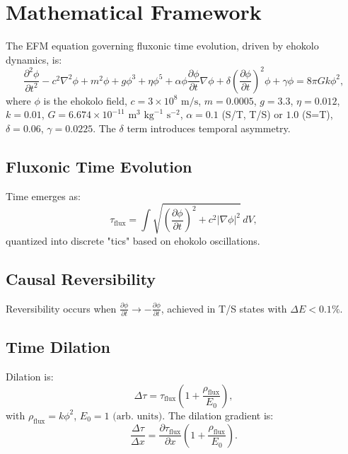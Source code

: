 \documentclass[11pt]{article}
\begin{document}
\section{Mathematical Framework}
The EFM equation governing fluxonic time evolution, driven by ehokolo dynamics, is:
\begin{equation}
\frac{\partial^2 \phi}{\partial t^2} - c^2 \nabla^2 \phi + m^2 \phi + g \phi^3 + \eta \phi^5 + \alpha \phi \frac{\partial \phi}{\partial t} \nabla \phi + \delta \left(\frac{\partial \phi}{\partial t}\right)^2 \phi + \gamma \phi = 8 \pi G k \phi^2,
\end{equation}
where \(\phi\) is the ehokolo field, \(c = 3 \times 10^8 \text{ m/s}\), \(m = 0.0005\), \(g = 3.3\), \(\eta = 0.012\), \(k = 0.01\), \(G = 6.674 \times 10^{-11} \text{ m}^3 \text{ kg}^{-1} \text{ s}^{-2}\), \(\alpha = 0.1\) (S/T, T/S) or \(1.0\) (S=T), \(\delta = 0.06\), \(\gamma = 0.0225\). The \(\delta\) term introduces temporal asymmetry.

\subsection{Fluxonic Time Evolution}
Time emerges as:
\begin{equation}
\tau_{\text{flux}} = \int \sqrt{\left(\frac{\partial \phi}{\partial t}\right)^2 + c^2 |\nabla \phi|^2} \, dV,
\end{equation}
quantized into discrete "tics" based on ehokolo oscillations.

\subsection{Causal Reversibility}
Reversibility occurs when \(\frac{\partial \phi}{\partial t} \to -\frac{\partial \phi}{\partial t}\), achieved in T/S states with \(\Delta E < 0.1\%\).

\subsection{Time Dilation}
Dilation is:
\begin{equation}
\Delta \tau = \tau_{\text{flux}} \left(1 + \frac{\rho_{\text{flux}}}{E_0}\right),
\end{equation}
with \(\rho_{\text{flux}} = k \phi^2\), \(E_0 = 1 \text{ (arb. units)}\). The dilation gradient is:
\begin{equation}
\frac{\Delta \tau}{\Delta x} = \frac{\partial \tau_{\text{flux}}}{\partial x} \left(1 + \frac{\rho_{\text{flux}}}{E_0}\right).
\end{equation}
\end{document}

